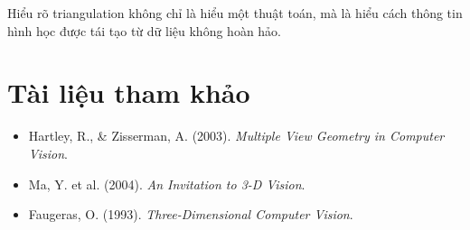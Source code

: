 Hiểu rõ triangulation không chỉ là hiểu một thuật toán, mà là hiểu cách thông tin hình học được tái tạo từ dữ liệu không hoàn hảo.

\section*{Tài liệu tham khảo}
\begin{itemize}
	\item[1] Hartley, R., \& Zisserman, A. (2003). \textit{Multiple View Geometry in Computer Vision}.
	\item[2] Ma, Y. et al. (2004). \textit{An Invitation to 3-D Vision}.
	\item[3] Faugeras, O. (1993). \textit{Three-Dimensional Computer Vision}.
\end{itemize}